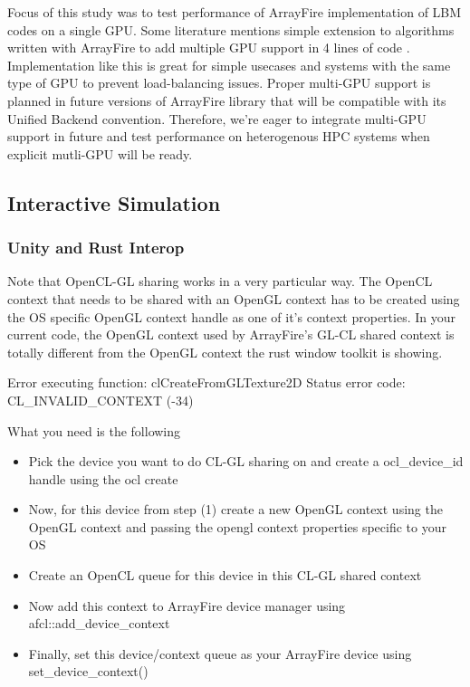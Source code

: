 Focus of this study was to test performance of ArrayFire implementation of LBM codes on a single GPU. Some literature mentions simple extension to algorithms written with ArrayFire to add multiple GPU support in 4 lines of code \cite{malcolmArrayFireGPUAcceleration2012a}. Implementation like this is great for simple usecases and systems with the same type of GPU to prevent load-balancing issues. Proper multi-GPU support is planned in future versions of ArrayFire library that will be compatible with its Unified Backend convention. Therefore, we're eager to integrate multi-GPU support in future and test performance on heterogenous HPC systems when explicit mutli-GPU will be ready.


\subsection{Interactive Simulation}

\subsubsection{Unity and Rust Interop}


Note that OpenCL-GL sharing works in a very particular way. The OpenCL context that needs to be shared with an OpenGL context has to be created using the OS specific OpenGL context handle as one of it's context properties. In your current code, the OpenGL context used by ArrayFire's GL-CL shared context is totally different from the OpenGL context the rust window toolkit is showing.

Error executing function: clCreateFromGLTexture2D  
Status error code: CL_INVALID_CONTEXT (-34)  

What you need is the following


\begin{itemize}
\item Pick the device you want to do CL-GL sharing on and create a ocl_device_id handle using the ocl create
\item Now, for this device from step (1) create a new OpenGL context using the OpenGL context and passing the opengl context properties specific to your OS
\item Create an OpenCL queue for this device in this CL-GL shared context
\item Now add this context to ArrayFire device manager using afcl::add_device_context 
\item Finally, set this device/context queue as your ArrayFire device using set_device_context()
\end{itemize}

